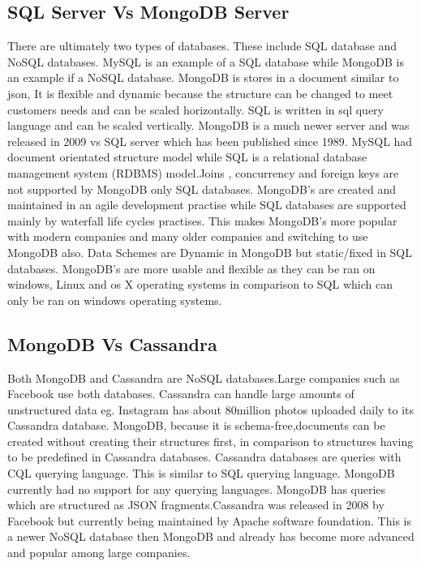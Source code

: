 \subsection{SQL Server Vs MongoDB Server}
There are ultimately two types of databases. These include SQL database and NoSQL databases. MySQL is an example of a SQL database while MongoDB is an example if a NoSQL database. MongoDB is stores in a document similar to json, It is flexible and dynamic because the structure can be changed to meet customers needs and can be scaled horizontally. SQL is written in sql query language and can be scaled vertically. MongoDB is a much newer server and was released in 2009 vs SQL server which has been published since 1989. MySQL had document orientated structure model while SQL is a relational database management system (RDBMS) model.Joins , concurrency and foreign keys are not supported by MongoDB only SQL databases. MongoDB's are created and maintained in an agile development practise while SQL databases are supported mainly by waterfall life cycles practises. This makes MongoDB's more popular with modern companies and many older companies and switching to use MongoDB also. Data Schemes are Dynamic in MongoDB but static/fixed in SQL databases. MongoDB's are more usable and flexible as they can be ran on windows, Linux and os X operating systems in comparison to SQL which can only be ran on windows operating systems.\cite{mongodb_vs_sql_server_2019}

\subsection{MongoDB Vs Cassandra}
Both MongoDB and Cassandra are NoSQL databases.Large companies such as Facebook use both databases. Cassandra can handle large amounts of unstructured data eg. Instagram has about 80million photos uploaded daily to its Cassandra database. MongoDB, because it is schema-free,documents can be created without creating their structures first, in comparison to structures having to be predefined in Cassandra databases. Cassandra databases are queries with CQL querying language. This is similar to SQL querying language.\cite{cassandra_vs_mongodb_2016} MongoDB currently had no support for any querying languages. MongoDB has queries which are structured as JSON fragments.Cassandra was released in 2008 by Facebook but currently being maintained by Apache software foundation. This is a newer NoSQL database then MongoDB and already has become more advanced and popular among large companies.\cite{sarig_2019}

